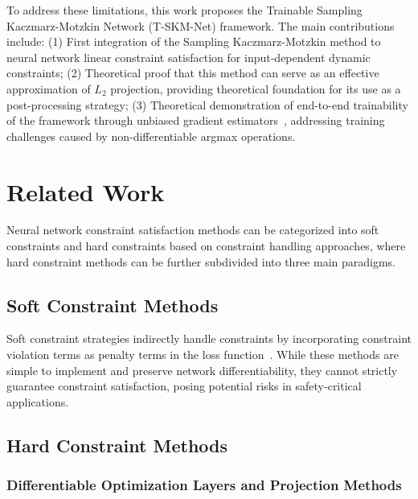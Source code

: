 \documentclass[letterpaper]{article} %
\begin{document}
To address these limitations, this work proposes the Trainable Sampling Kaczmarz-Motzkin Network (T-SKM-Net) framework. The main contributions include: (1) First integration of the Sampling Kaczmarz-Motzkin method to neural network linear constraint satisfaction for input-dependent dynamic constraints; (2) Theoretical proof that this method can serve as an effective approximation of $L_2$ projection, providing theoretical foundation for its use as a post-processing strategy; (3) Theoretical demonstration of end-to-end trainability of the framework through unbiased gradient estimators~\cite{robbins1951stochastic,bottou2010large,goda2023constructing}, addressing training challenges caused by non-differentiable argmax operations.

\section{Related Work} 

Neural network constraint satisfaction methods can be categorized into soft constraints and hard constraints based on constraint handling approaches, where hard constraint methods can be further subdivided into three main paradigms. 

\subsection{Soft Constraint Methods} 

Soft constraint strategies indirectly handle constraints by incorporating constraint violation terms as penalty terms in the loss function~\cite{raissiPhysicsinformedNeuralNetworks2019,doi:10.1137/18M1225409}. While these methods are simple to implement and preserve network differentiability, they cannot strictly guarantee constraint satisfaction, posing potential risks in safety-critical applications. 

\subsection{Hard Constraint Methods} 

\subsubsection{Differentiable Optimization Layers and Projection Methods} 
\end{document}
